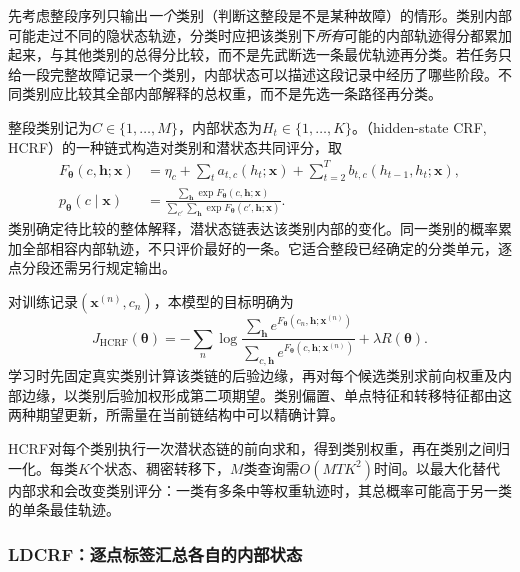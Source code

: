 先考虑整段序列只输出\emph{一个}类别（判断这整段是不是某种故障）的情形。类别内部可能走过不同的隐状态轨迹，分类时应把该类别下\emph{所有}可能的内部轨迹得分都累加起来，与其他类别的总得分比较，而不是先武断选一条最优轨迹再分类。若任务只给一段完整故障记录一个类别，内部状态可以描述这段记录中经历了哪些阶段。不同类别应比较其全部内部解释的总权重，而不是先选一条路径再分类。

整段类别记为$C\in\{1,\ldots,M\}$，内部状态为$H_t\in\{1,\ldots,K\}$。（hidden-state CRF, HCRF）的一种链式构造对类别和潜状态共同评分，取
\begin{equation}
  \begin{aligned}
    F_{\bm\theta}(c,\bm h;\bm x)
      &=\eta_c+\sum_t a_{t,c}(h_t;\bm x)
                      +\sum_{t=2}^T b_{t,c}(h_{t-1},h_t;\bm x),\\
    p_{\bm\theta}(c\mid\bm x)
      &=\frac{\sum_{\bm h}\exp F_{\bm\theta}(c,\bm h;\bm x)}
        {\sum_{c'}\sum_{\bm h}\exp F_{\bm\theta}(c',\bm h;\bm x)}.
  \end{aligned}
  \label{eq:pgm-dynamic-undirected-hcrf}
\end{equation}
类别确定待比较的整体解释，潜状态链表达该类别内部的变化。同一类别的概率累加全部相容内部轨迹，不只评价最好的一条。它适合整段已经确定的分类单元，逐点分段还需另行规定输出。

对训练记录$(\bm x^{(n)},c_n)$，本模型的目标明确为
\begin{equation}
  J_{\mathrm{HCRF}}(\bm\theta)
    =-\sum_n\log\frac{\sum_{\bm h}e^{F_{\bm\theta}(c_n,\bm h;\bm x^{(n)})}}
             {\sum_{c,\bm h}e^{F_{\bm\theta}(c,\bm h;\bm x^{(n)})}}
       +\lambda R(\bm\theta).
  \label{eq:pgm-dynamic-undirected-hcrf-objective}
\end{equation}
学习时先固定真实类别计算该类链的后验边缘，再对每个候选类别求前向权重及内部边缘，以类别后验加权形成第二项期望。类别偏置、单点特征和转移特征都由这两种期望更新，所需量在当前链结构中可以精确计算。

HCRF对每个类别执行一次潜状态链的前向求和，得到类别权重，再在类别之间归一化。每类$K$个状态、稠密转移下，$M$类查询需$O(MTK^2)$时间。以最大化替代内部求和会改变类别评分：一类有多条中等权重轨迹时，其总概率可能高于另一类的单条最佳轨迹。

\subsubsection{LDCRF：逐点标签汇总各自的内部状态}
\label{sec:pgm-dynamic-undirected-ldcrf-model}

